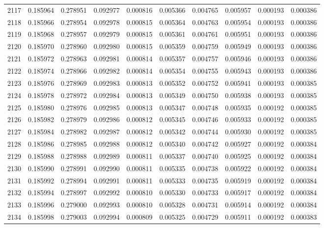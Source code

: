 \begin{tabular}{lrrrrrrrrr}
2117 & 0.185964 & 0.278951 & 0.092977 & 0.000816 & 0.005366 & 0.004765 & 0.005957 & 0.000193 & 0.000386 \\
2118 & 0.185966 & 0.278954 & 0.092978 & 0.000815 & 0.005364 & 0.004763 & 0.005954 & 0.000193 & 0.000386 \\
2119 & 0.185968 & 0.278957 & 0.092979 & 0.000815 & 0.005361 & 0.004761 & 0.005951 & 0.000193 & 0.000386 \\
2120 & 0.185970 & 0.278960 & 0.092980 & 0.000815 & 0.005359 & 0.004759 & 0.005949 & 0.000193 & 0.000386 \\
2121 & 0.185972 & 0.278963 & 0.092981 & 0.000814 & 0.005357 & 0.004757 & 0.005946 & 0.000193 & 0.000386 \\
2122 & 0.185974 & 0.278966 & 0.092982 & 0.000814 & 0.005354 & 0.004755 & 0.005943 & 0.000193 & 0.000386 \\
2123 & 0.185976 & 0.278969 & 0.092983 & 0.000813 & 0.005352 & 0.004752 & 0.005941 & 0.000193 & 0.000385 \\
2124 & 0.185978 & 0.278972 & 0.092984 & 0.000813 & 0.005349 & 0.004750 & 0.005938 & 0.000193 & 0.000385 \\
2125 & 0.185980 & 0.278976 & 0.092985 & 0.000813 & 0.005347 & 0.004748 & 0.005935 & 0.000192 & 0.000385 \\
2126 & 0.185982 & 0.278979 & 0.092986 & 0.000812 & 0.005345 & 0.004746 & 0.005933 & 0.000192 & 0.000385 \\
2127 & 0.185984 & 0.278982 & 0.092987 & 0.000812 & 0.005342 & 0.004744 & 0.005930 & 0.000192 & 0.000385 \\
2128 & 0.185986 & 0.278985 & 0.092988 & 0.000812 & 0.005340 & 0.004742 & 0.005927 & 0.000192 & 0.000384 \\
2129 & 0.185988 & 0.278988 & 0.092989 & 0.000811 & 0.005337 & 0.004740 & 0.005925 & 0.000192 & 0.000384 \\
2130 & 0.185990 & 0.278991 & 0.092990 & 0.000811 & 0.005335 & 0.004738 & 0.005922 & 0.000192 & 0.000384 \\
2131 & 0.185992 & 0.278994 & 0.092991 & 0.000811 & 0.005333 & 0.004735 & 0.005919 & 0.000192 & 0.000384 \\
2132 & 0.185994 & 0.278997 & 0.092992 & 0.000810 & 0.005330 & 0.004733 & 0.005917 & 0.000192 & 0.000384 \\
2133 & 0.185996 & 0.279000 & 0.092993 & 0.000810 & 0.005328 & 0.004731 & 0.005914 & 0.000192 & 0.000384 \\
2134 & 0.185998 & 0.279003 & 0.092994 & 0.000809 & 0.005325 & 0.004729 & 0.005911 & 0.000192 & 0.000383 \\

\end{tabular}
